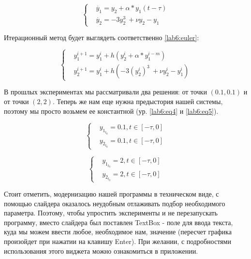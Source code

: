\begin{equation}\label{lab6:eq3}
\begin{cases}
    &\dot{y_1} = y_2 + \alpha * y_1(t-\tau)\\
    &\dot{y_2} = -3y_2^3\ + \nu y_2 - y_1
\end{cases}
\end{equation}

Итерационный метод будет выглядеть соответственно \eqref{lab6:euler}:

\begin{equation}
    \begin{cases}
        &y_1^{i+1} = y_1^i + h(y_2^i + \alpha * y_1^{i-m})\\
        &y_2^{i+1} = y_1^i + h(-3(y_2^i)^3\ + \nu y_2^i - y_1^i)
    \end{cases}
\end{equation}

В прошлых экспериментах мы рассматривали два решения: от точки
$(0.1, 0.1)$ и от точки $(2, 2)$. Теперь же нам еще нужна
предыстория нашей системы, поэтому мы просто возьмем ее константной
(ур. \eqref{lab6:eq4} и \eqref{lab6:eq5}).

\begin{equation}\label{lab6:eq4}
  \begin{cases}
    &y_{1_{t_0}} = 0.1, t \in [-\tau, 0]\\
    &y_{2_{t_0}} = 0.1, t \in [-\tau, 0]
  \end{cases}
\end{equation}

\begin{equation}\label{lab6:eq5}
  \begin{cases}
    &y_{1_{t_0}} = 2, t \in [-\tau, 0]\\
    &y_{2_{t_0}} = 2, t \in [-\tau, 0]
  \end{cases}
\end{equation}

Стоит отметить, модернизацию нашей программы в техническом
виде, с помощью слайдера оказалось неудобным отлаживать
подбор необходимого параметра. Поэтому, чтобы упростить
эксперименты и не перезапускать программу, вместо слайдера
был поставлен \textmd{TextBox} - поле для ввода текста, куда мы
можем ввести любое, необходимое нам, значение (пересчет
графика произойдет при нажатии на клавишу \textmd{Enter}).
При желании, с подробностями использования этого виджета
можно ознакомиться в приложении.

